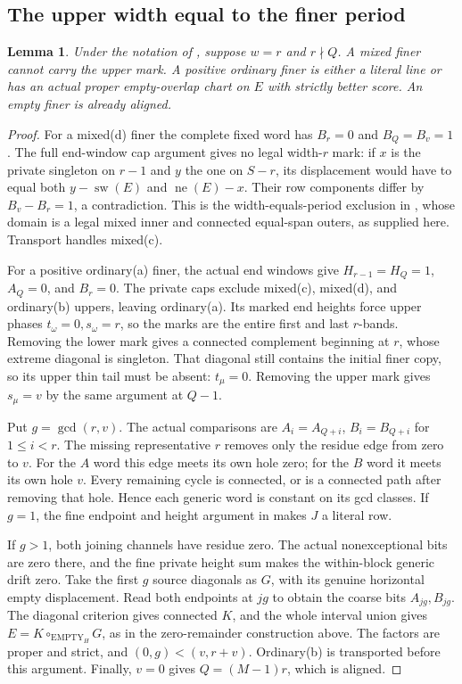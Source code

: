 \documentclass[11pt,a4paper]{amsart}
\numberwithin{equation}{section}
\theoremstyle{plain}
\newtheorem{lemma}[theorem]{Lemma}
\theoremstyle{definition}
\begin{document}
\subsection{The upper width equal to the finer period}
\begin{lemma}\label{rt:boundary}
Under the notation of , suppose \(w=r\) and \(r\nmid Q\).  A mixed finer cannot carry the upper mark.  A positive ordinary finer is either a literal line or has an actual proper empty-overlap chart on \(E\) with strictly better score.  An empty finer is already aligned.
\end{lemma}
\begin{proof}
For a mixed(d) finer the complete fixed word has \(B_r=0\) and \(B_Q=B_v=1\).  The full end-window cap argument gives no legal width-\(r\) mark: if \(x\) is the private singleton on \(r-1\) and \(y\) the one on \(S-r\), its displacement would have to equal both \(y-\operatorname{sw}(E)\) and \(\operatorname{ne}(E)-x\).  Their row components differ by \(B_v-B_r=1\), a contradiction.  This is the width-equals-period exclusion in \cite[Mark-transfer corollary for mixed marked inners]{Shields2026Gluing}, whose domain is a legal mixed inner and connected equal-span outers, as supplied here.  Transport handles mixed(c).

For a positive ordinary(a) finer, the actual end windows give
\(H_{r-1}=H_Q=1\), \(A_Q=0\), and \(B_r=0\).  The private caps exclude mixed(c), mixed(d), and ordinary(b) uppers, leaving ordinary(a).  Its marked end heights force upper phases \(t_\omega=0,s_\omega=r\), so the marks are the entire first and last \(r\)-bands.  Removing the lower mark gives a connected complement beginning at \(r\), whose extreme diagonal is singleton.  That diagonal still contains the initial finer copy, so its upper thin tail must be absent: \(t_\mu=0\).  Removing the upper mark gives \(s_\mu=v\) by the same argument at \(Q-1\).

Put \(g=\gcd(r,v)\).  The actual comparisons are
\(A_i=A_{Q+i}\), \(B_i=B_{Q+i}\) for \(1\le i<r\).  The missing representative \(r\) removes only the residue edge from zero to \(v\).  For the \(A\) word this edge meets its own hole zero; for the \(B\) word it meets its own hole \(v\).  Every remaining cycle is connected, or is a connected path after removing that hole.  Hence each generic word is constant on its gcd classes.  If \(g=1\), the fine endpoint and height argument in  makes \(J\) a literal row.

If \(g>1\), both joining channels have residue zero.  The actual nonexceptional bits are zero there, and the fine private height sum makes the within-block generic drift zero.  Take the first \(g\) source diagonals as \(G\), with its genuine horizontal empty displacement.  Read both endpoints at \(jg\) to obtain the coarse bits \(A_{jg},B_{jg}\).  The diagonal criterion gives connected \(K\), and the whole interval union gives \(E=K\circ_{\mathrm{EMPTY}_H}G\), as in the zero-remainder construction above.  The factors are proper and strict, and \((0,g)<(v,r+v)\).  Ordinary(b) is transported before this argument.  Finally, \(v=0\) gives \(Q=(M-1)r\), which is aligned.
\end{proof}
\end{document}
